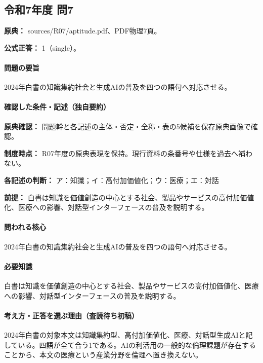 \subsection{令和7年度 問7}
\label{q:r07-reg-apt-07}

\noindent\textbf{原典：} sources/R07/aptitude.pdf、PDF物理7頁。

\textbf{公式正答：} 1（single）。

\paragraph{問題の要旨} 2024年白書の知識集約社会と生成AIの普及を四つの語句へ対応させる。

\paragraph{確認した条件・記述（独自要約）}\mbox{}\par

\noindent\textbf{原典確認：} 問題幹と各記述の主体・否定・全称・表の5候補を保存原典画像で確認。\par

\noindent\textbf{制度時点：} R07年度の原典表現を保持。現行資料の条番号や仕様を過去へ補わない。\par

\noindent\textbf{各記述の判断：} ア：知識；イ：高付加価値化；ウ：医療；エ：対話\par

\noindent\textbf{前提：} 白書は知識を価値創造の中心とする社会、製品やサービスの高付加価値化、医療への影響、対話型インターフェースの普及を説明する。\par

\paragraph{問われる核心} 2024年白書の知識集約社会と生成AIの普及を四つの語句へ対応させる。

\paragraph{必要知識} 白書は知識を価値創造の中心とする社会、製品やサービスの高付加価値化、医療への影響、対話型インターフェースの普及を説明する。

\paragraph{考え方・正答を選ぶ理由（査読待ち初稿）} 2024年白書の対象本文は知識集約型、高付加価値化、医療、対話型生成AIと記している。四語が全て合う1である。AIの利活用の一般的な倫理課題が存在することから、本文の医療という産業分野を倫理へ置き換えない。

